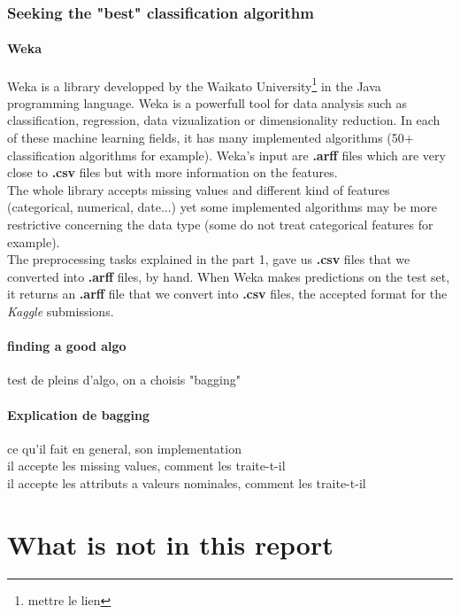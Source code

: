 \documentclass[11pt,a4paper,portrait]{article}
\begin{document}
\section{Seeking the "best" classification algorithm}

\subsection{Weka}
Weka is a library developped by the Waikato University\footnote{mettre le lien} in the Java programming language. Weka is a powerfull tool for data analysis such as classification, regression, data vizualization or dimensionality reduction. In each of these machine learning fields, it has many implemented algorithms (50+ classification algorithms for example). Weka's input are \textbf{.arff} files which are very close to \textbf{.csv} files but with more information on the features.\\
The whole library accepts missing values and different kind of features (categorical, numerical, date...) yet some implemented algorithms may be more restrictive concerning the data type (some do not treat categorical features for example).\\
The preprocessing tasks explained in the part 1, gave us \textbf{.csv} files that we converted into \textbf{.arff} files, by hand. When Weka makes predictions on the test set, it returns an \textbf{.arff} file that we convert into \textbf{.csv} files, the accepted format for the \textit{Kaggle} submissions.

\subsection{finding a good algo}
test de pleins d'algo, on a choisis "bagging"

\subsection{Explication de bagging}
ce qu'il fait en general, son implementation\\
il accepte les missing values, comment les traite-t-il\\
il accepte les attributs a valeurs nominales, comment les traite-t-il




\part{What is not in this report}
\setcounter{section}{0}
\end{document}
